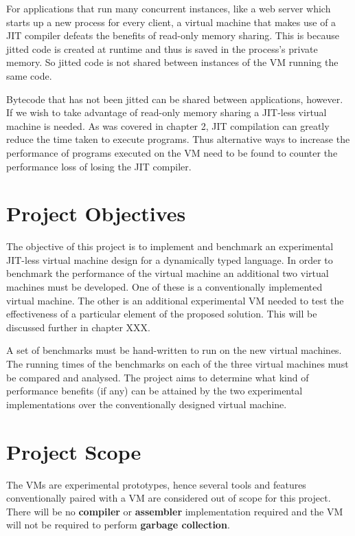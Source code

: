 \documentclass[english,a4paper]{report}
\begin{document}
For applications that run many concurrent instances, like a web server
which starts up a new process for every client, a virtual
machine that makes use of a JIT compiler defeats the benefits of
read-only memory sharing. This is because jitted code is created at 
runtime and thus is saved in the process's private memory. So jitted 
code is not shared between instances of the VM running the same 
code. 

Bytecode that has not been jitted can be shared between applications, however. If we wish to take advantage of read-only memory sharing a JIT-less virtual machine is needed. As was covered in chapter 2, JIT compilation can greatly reduce the time taken to execute programs. Thus alternative ways to increase the performance of programs executed on the VM need to be found to counter the performance loss of losing the JIT compiler.

\section{Project Objectives}
The objective of this project is to implement and benchmark an experimental JIT-less virtual machine design for a dynamically typed language. In order to benchmark the performance of the virtual machine an additional two virtual machines must be developed. One of these is a conventionally implemented virtual machine. The other is an additional experimental VM needed to test the effectiveness of a particular element of the proposed solution. This will be discussed further in chapter XXX. 

A set of benchmarks must be hand-written to run on the new virtual machines. The running times of the benchmarks on each of the three virtual machines must be compared and analysed. The project aims to determine what kind of performance benefits (if any) can be attained by the two experimental implementations over the conventionally designed virtual machine.

\section{Project Scope}

The VMs are experimental prototypes, hence several tools and features conventionally paired with a VM are considered out of scope for this project. There will be no \textbf{compiler} or \textbf{assembler} implementation required and the VM will not be required to perform \textbf{garbage collection}.
\end{document}
